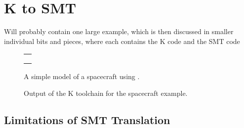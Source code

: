 \section{K to SMT}

Will probably contain one large example, which is then discussed in
smaller individual bits and pieces, where each contains the K code and
the SMT code

\begin{figure}
\centering
\begin{tabular}{c}
\hline \\
 \\ \\
\hline
\end{tabular}
\caption{A simple model of a spacecraft using \Klang{}.}
\label{fig:spacecraftSmt}
\end{figure}

\begin{figure}
\caption{Output of the K toolchain for the spacecraft example.}
\label{fig:shapes}
\end{figure}

\subsection{Limitations of SMT Translation}
